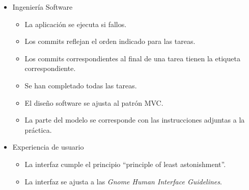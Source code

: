 \documentclass[11pt,a4paper]{article}
\begin{document}
\begin{itemize}
\item Ingeniería Software
  \begin{itemize}
  \item La aplicación se ejecuta si fallos.
  \item Los commits reflejan el orden indicado para las tareas.
  \item Los commits correspondientes al final de una tarea tienen la
    etiqueta correspondiente.
  \item Se han completado todas las tareas.
  \item El diseño software se ajusta al patrón MVC.
  \item La parte del modelo se corresponde con las instrucciones
    adjuntas a la práctica.
  \end{itemize}

\item Experiencia de usuario
  \begin{itemize}
  \item La interfaz cumple el principio ``principle of least astonishment''.
  \item La interfaz se ajusta a las \emph{Gnome Human Interface
      Guidelines}.
  \end{itemize}
\end{itemize}
\end{document}
